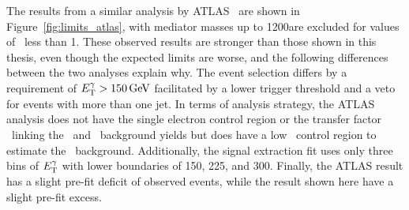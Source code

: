 The results from a similar analysis by ATLAS~\cite{ATLAS2017} are shown in Figure~\ref{fig:limits_atlas}, with mediator masses up to 1200\GeV are excluded for values of \mdm\ less than 1\GeV.
These observed results are stronger than those shown in this thesis, even though the expected limits are worse, and the following differences between the two analyses explain why.
The event selection differs by a requirement of $E_{\mathrm{T}}^{\gamma} > 150\,\text{Ge\hspace{-.08em}V}$ facilitated by a lower trigger threshold and a veto for events with more than one jet.
In terms of analysis strategy, the ATLAS analysis does not have the single electron control region or the transfer factor \fZW\ linking the \zinvg\ and \wlng\ background yields but does have a low \met\ control region to estimate the \gj\ background.
Additionally, the signal extraction fit uses only three bins of $E_{\mathrm{T}}^{\gamma}$ with lower boundaries of 150\GeV, 225\GeV, and 300\GeV.
Finally, the ATLAS result has a slight pre-fit deficit of observed events, while the result shown here have a slight pre-fit excess.

